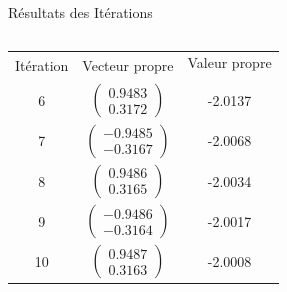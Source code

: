 \documentclass[french, 10pt]{beamer}
\theoremstyle{definition}
\begin{document}
\begin{frame}{Résultats des Itérations}
\begin{columns}[T]
\begin{column}{0.5\textwidth}
            \begin{tabular}{|c|c|c|}
                \hline
                \multirow{2}{*}{Itération} & \multirow{2}{*}{Vecteur propre} & Valeur propre \\
                 & &  \\
                \hline
                6 & $\begin{pmatrix} 0.9483 \\ 0.3172 \end{pmatrix}$ & -2.0137 \\
                7 & $\begin{pmatrix} -0.9485 \\ -0.3167 \end{pmatrix}$ & -2.0068 \\
                8 & $\begin{pmatrix} 0.9486 \\ 0.3165 \end{pmatrix}$ & -2.0034 \\
                9 & $\begin{pmatrix} -0.9486 \\ -0.3164 \end{pmatrix}$ & -2.0017 \\
                10 & $\begin{pmatrix} 0.9487 \\ 0.3163 \end{pmatrix}$ & -2.0008 \\
                \hline
            \end{tabular}
        \end{column}
    \end{columns}

 
\end{frame}
\end{document}
